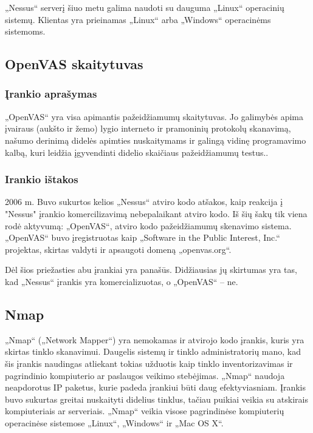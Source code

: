 \documentclass[a4paper,12pt,fleqn]{article}
\begin{document}
„Nessus“ serverį šiuo metu galima naudoti su dauguma „Linux“ operacinių sistemų. Klientas yra prieinamas „Linux“ arba „Windows“ operacinėms sistemoms. 



\subsection{OpenVAS skaitytuvas}
\label{sec:example}

\subsubsection{Įrankio aprašymas}

„OpenVAS“ yra visa apimantis pažeidžiamumų skaitytuvas. Jo galimybės apima įvairaus (aukšto ir žemo) lygio interneto ir pramoninių protokolų skanavimą, našumo derinimą didelės apimties nuskaitymams ir galingą vidinę programavimo kalbą, kuri leidžia įgyvendinti didelio skaičiaus pažeidžiamumų testus.\cite{inproceedings}.

\subsubsection{Irankio ištakos}


2006 m. Buvo sukurtos kelios „Nessus“ atviro kodo atšakos, kaip reakcija į "Nessus" įrankio komercilizavimą nebepalaikant atviro kodo. Iš šių šakų tik viena rodė aktyvumą: „OpenVAS“, atviro kodo pažeidžiamumų skenavimo sistema. „OpenVAS“ buvo įregistruotas kaip „Software in the Public Interest, Inc.“ projektas, skirtas valdyti ir apsaugoti domeną „openvas.org“.

Dėl šios priežasties abu įrankiai yra panašūs. Didžiausias jų skirtumas yra tas, kad „Nessus“ įrankis yra komercializuotas, o „OpenVAS“ – ne.


\subsection{Nmap}
\label{sec:nmap}

„Nmap“ („Network Mapper“) yra nemokamas ir atvirojo kodo įrankis, kuris yra skirtas tinklo skanavimui. Daugelis sistemų ir tinklo administratorių mano, kad šis įrankis naudingas atliekant tokias užduotis kaip tinklo inventorizavimas ir  pagrindinio kompiuterio ar paslaugos veikimo stebėjimas. „Nmap“ naudoja neapdorotus IP paketus, kurie padeda įrankiui būti daug efektyviasniam. Įrankis buvo sukurtas greitai nuskaityti didelius tinklus, tačiau puikiai veikia su atskirais kompiuteriais ar serveriais. „Nmap“ veikia visose pagrindinėse kompiuterių operacinėse sistemose  „Linux“, „Windows“ ir „Mac OS X“\cite{Orebaugh:2008:NEY:1571843}. 
\end{document}
